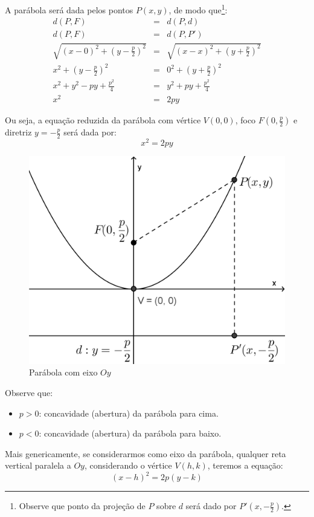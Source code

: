 A parábola será dada pelos pontos $P(x, y)$, de modo que\footnote{Observe que ponto da projeção de $P$ sobre $d$ será dado por $P'(x,-\frac{p}{2})$.}:
\begin{eqnarray*}
d(P, F) & = & d(P, d)   \\
d(P, F) & = & d(P, P')   \\
\sqrt{(x-0)^2+\left(y-\frac{p}{2}\right) ^2} & = & \sqrt{(x-x)^2+\left(y+\frac{p}{2}\right)^2}  \\
x^2+\left(y-\frac{p}{2}\right)^2 & = & 0^2+\left(y+\frac{p}{2}\right)^2  \\
x^2+y^2-py+\frac{p^2}{4} & = & y^2+py+\frac{p^2}{4} \\
x^2 & = & 2py 
\end{eqnarray*}

Ou seja, a equação reduzida da parábola com vértice $V(0, 0)$, foco $\displaystyle F(0,\frac{p}{2})$ e diretriz $\displaystyle y=-\frac{p}{2}$ será dada por: $$x^2=2py$$

\begin{figure}[H]
\centering
\includegraphics[width=0.4\linewidth]{analitica/imagens/parabolav1.png}
\caption{Parábola com eixo $Oy$}
\label{fig:para1}
\end{figure}

Observe que:
\begin{itemize}
  \item $p>0$: concavidade (abertura) da parábola para cima.
  \item $p<0$: concavidade (abertura) da parábola para baixo.
\end{itemize}

Mais genericamente, se considerarmos como eixo da parábola, qualquer reta vertical paralela a $Oy$, considerando o vértice $V(h, k)$, teremos a equação: $$(x-h)^2=2p(y-k)$$


